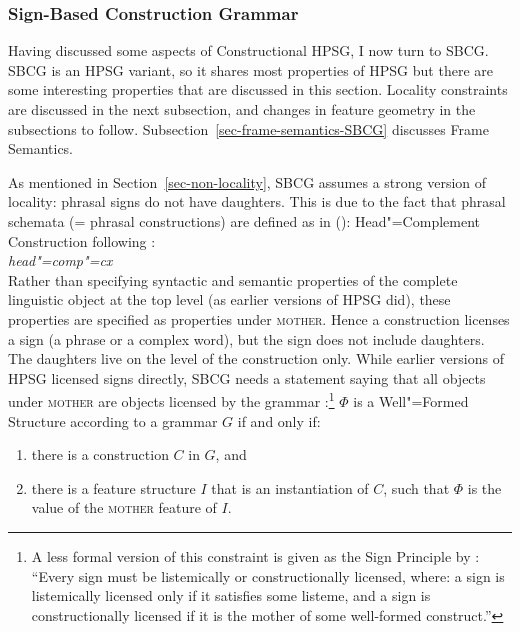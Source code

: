 \documentclass[output=paper
	        ,collection
	        ,collectionchapter
 	        ,biblatex
                ,babelshorthands
                ,newtxmath
                ,draftmode
                ,colorlinks, citecolor=brown
]{langscibook}
\begin{document}
\subsubsection{Sign-Based Construction Grammar}
\label{cxg:sec-sbcg}\label{sec-sbcg}

Having discussed some aspects of Constructional HPSG, I now turn to SBCG. SBCG is an HPSG variant,
so it shares most properties of HPSG but there are some interesting properties that are discussed in
this section. Locality constraints are discussed in the next subsection, and changes in feature geometry
in the subsections to follow. Subsection~\ref{sec-frame-semantics-SBCG} discusses Frame Semantics.

\label{sec-locality}

As mentioned in Section~\ref{sec-non-locality}, SBCG assumes a strong version of locality: phrasal
signs do not have daughters. This is due to the fact that phrasal schemata (= phrasal constructions)
are defined as in ():
\eas
Head"=Complement Construction following \citet[481]{SWB2003a}:\\
\emph{head"=comp"=cx} \impl\\
\zs
Rather than specifying syntactic and semantic properties of the complete linguistic object at the
top level (as earlier versions of HPSG did), these properties are specified as properties under \textsc{mother}. Hence a construction
licenses a sign (a phrase or a complex word), but the sign does not include daughters. The daughters live on the level of the
construction only. While earlier versions of HPSG licensed signs directly, SBCG needs a statement
saying that all objects under \textsc{mother} are objects licensed by the grammar \citep*[]{SWB2003a}:\footnote{%
A less formal version of this constraint is given as the Sign Principle by
\citet[]{Sag2012a}: ``Every sign must be listemically or constructionally licensed, where: a
sign is listemically licensed only if it satisfies some listeme, and a sign is constructionally
licensed if it is the mother of some well-formed construct.''
}
\ea
\label{meta-construction-statemnet}
$\Phi$ is a Well"=Formed Structure according to a grammar $G$ if and only if:
\begin{enumerate}
\item there is a construction $C$ in $G$, and
\item there is a feature structure $I$ that is an instantiation of $C$, such that
      $\Phi$ is the value of the \textsc{mother} feature of $I$.
\end{enumerate}
\end{document}
